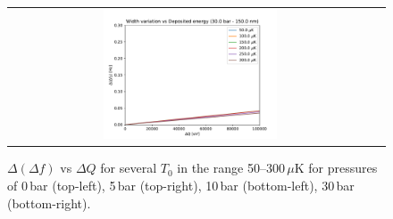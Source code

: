 \documentclass[a4paper,12pt]{article}
\begin{document}
\begin{figure}[!ht]
\begin{center}
\begin{tabular}{cc}
    \includegraphics[width=0.49\textwidth]{DeltaDeltaW_vs_DE-30bar}
  \end{tabular}
  \end{center}
  \caption{$\Delta(\Delta f)$ vs $\Delta Q$ for several $T_0$ in the range 50--300\,$\mu$K for pressures of 0\,bar (top-left), 5\,bar (top-right), 10\,bar (bottom-left), 30\,bar (bottom-right).}
  \label{fig:DeltaDeltaWvsDE}
\end{figure}
\end{document}
